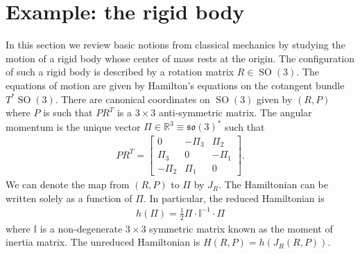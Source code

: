 \documentclass[12pt]{amsart}
\newcommand{\so}{\ensuremath{\mathfrak{so}}}
\DeclareMathOperator{\SO}{SO}
\begin{document}
\section{Example: the rigid body}
\label{sec:rigid_body}
  In this section we review basic notions from classical mechanics
by studying the motion of a rigid body whose center of mass rests
at the origin.
The configuration of such a rigid body is described by a
rotation matrix $R \in \SO(3)$.
The equations of motion are given by Hamilton's equations
on the cotangent bundle $T^{\ast}\SO(3)$.
There are canonical coordinates on $\SO(3)$ given by $(R,P)$
where $P$ is such that $P R^T$ is a $3 \times 3$ anti-symmetric matrix.
The angular momentum is the
unique vector $\Pi \in \mathbb{R}^3 \equiv \so(3)^*$ such that
\begin{align*}
  PR^T = \begin{bmatrix}
    0 & -\Pi_3 & \Pi_2 \\
    \Pi_3 & 0 & -\Pi_1 \\
    -\Pi_2 & \Pi_1 & 0 
    \end{bmatrix}.
\end{align*}
We can denote the map from $(R,P)$ to $\Pi$ by $J_R$.
The Hamiltonian can be written solely as a function
of $\Pi$.  In particular, the reduced Hamiltonian is
\begin{align*}
  h(\Pi) = \frac{1}{2}\Pi \cdot \mathbb{I}^{-1} \cdot \Pi
\end{align*}
where $\mathbb{I}$ is a non-degenerate $3\times 3$ symmetric matrix
known as the moment of inertia matrix.
The unreduced Hamiltonian is $H(R,P) = h(J_R(R,P))$.
\end{document}
